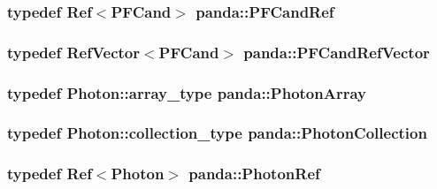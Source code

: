 \label{namespacepanda_a0ca34b0773035be0526701d0b93426e2}
\hypertarget{namespacepanda_a0427290b9b2d3622f3a6ee8829a878ea}{
\subsubsection[{PFCandRef}]{\setlength{\rightskip}{0pt plus 5cm}typedef {\bf Ref}$<${\bf PFCand}$>$ {\bf panda::PFCandRef}}}
\label{namespacepanda_a0427290b9b2d3622f3a6ee8829a878ea}
\hypertarget{namespacepanda_a0b660af02255ee546b472b239c5ddbc1}{
\subsubsection[{PFCandRefVector}]{\setlength{\rightskip}{0pt plus 5cm}typedef {\bf RefVector}$<${\bf PFCand}$>$ {\bf panda::PFCandRefVector}}}
\label{namespacepanda_a0b660af02255ee546b472b239c5ddbc1}
\hypertarget{namespacepanda_ad0a6600ca9dca4eeb7e932c99890e060}{
\subsubsection[{PhotonArray}]{\setlength{\rightskip}{0pt plus 5cm}typedef {\bf Photon::array\_\-type} {\bf panda::PhotonArray}}}
\label{namespacepanda_ad0a6600ca9dca4eeb7e932c99890e060}
\hypertarget{namespacepanda_a4acbed6412a6a61d07b0960736e25015}{
\subsubsection[{PhotonCollection}]{\setlength{\rightskip}{0pt plus 5cm}typedef {\bf Photon::collection\_\-type} {\bf panda::PhotonCollection}}}
\label{namespacepanda_a4acbed6412a6a61d07b0960736e25015}
\hypertarget{namespacepanda_ad94d8e9e3f18c0a85465d5d8ba8b1d75}{
\subsubsection[{PhotonRef}]{\setlength{\rightskip}{0pt plus 5cm}typedef {\bf Ref}$<${\bf Photon}$>$ {\bf panda::PhotonRef}}}
\label{namespacepanda_ad94d8e9e3f18c0a85465d5d8ba8b1d75}
